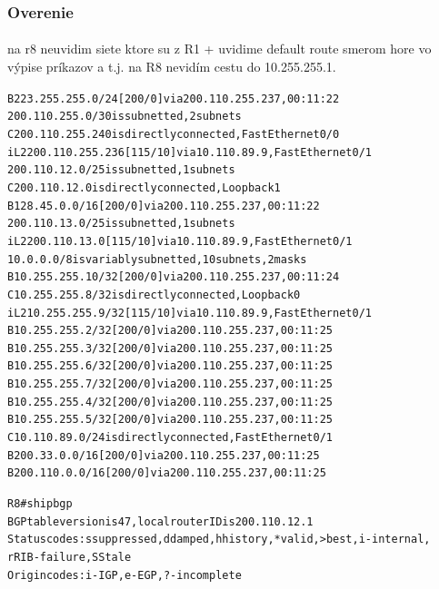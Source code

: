 \documentclass[12pt,twoside,a4paper]{report}
\begin{document}
\subsubsection{Overenie}
\paragraph{}
na r8 neuvidim siete ktore su z R1 + uvidime default route smerom hore vo výpise príkazov  a  t.j. na R8 nevidím cestu do 10.255.255.1.

\noindent
{\selectfont
\begin{small}
\begin{alltt}
B    223.255.255.0/24 [200/0] via 200.110.255.237, 00:11:22
     200.110.255.0/30 is subnetted, 2 subnets
C       200.110.255.240 is directly connected, FastEthernet0/0
i L2    200.110.255.236 [115/10] via 10.110.89.9, FastEthernet0/1
     200.110.12.0/25 is subnetted, 1 subnets
C       200.110.12.0 is directly connected, Loopback1
B    128.45.0.0/16 [200/0] via 200.110.255.237, 00:11:22
     200.110.13.0/25 is subnetted, 1 subnets
i L2    200.110.13.0 [115/10] via 10.110.89.9, FastEthernet0/1
     10.0.0.0/8 is variably subnetted, 10 subnets, 2 masks
B       10.255.255.10/32 [200/0] via 200.110.255.237, 00:11:24
C       10.255.255.8/32 is directly connected, Loopback0
i L2    10.255.255.9/32 [115/10] via 10.110.89.9, FastEthernet0/1
B       10.255.255.2/32 [200/0] via 200.110.255.237, 00:11:25
B       10.255.255.3/32 [200/0] via 200.110.255.237, 00:11:25
B       10.255.255.6/32 [200/0] via 200.110.255.237, 00:11:25
B       10.255.255.7/32 [200/0] via 200.110.255.237, 00:11:25
B       10.255.255.4/32 [200/0] via 200.110.255.237, 00:11:25
B       10.255.255.5/32 [200/0] via 200.110.255.237, 00:11:25
C       10.110.89.0/24 is directly connected, FastEthernet0/1
B    200.33.0.0/16 [200/0] via 200.110.255.237, 00:11:25
B    200.110.0.0/16 [200/0] via 200.110.255.237, 00:11:25



R8#sh ip bgp
BGP table version is 47, local router ID is 200.110.12.1
Status codes: s suppressed, d damped, h history, * valid, > best, i - internal,
              r RIB-failure, S Stale
Origin codes: i - IGP, e - EGP, ? - incomplete


\end{alltt}
\end{small}}
\end{document}
